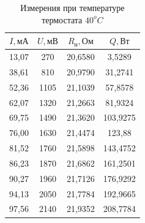     \begin{table}[!ht]
        \begin{minipage}{.42\linewidth}
            \centering
            \begin{tabular}{|c|c|c|c|}
                \hline

                $I, \text{мА}$ & $U, \text{мВ}$ &  $R_\text{н}, \text{Ом}$ & $Q, \text{Вт}$\\ \hline
                13,07	& 270	& 20,6580	& 3,5289 \\ \hline
                38,61	& 810	& 20,9790	& 31,2741 \\ \hline
                52,36	& 1105	& 21,1039	& 57,8578 \\ \hline
                62,07	& 1320	& 21,2663	& 81,9324 \\ \hline
                69,75	& 1490	& 21,3620	& 103,9275 \\ \hline
                76,00   & 1630	& 21,4474	& 123,88 \\ \hline
                81,52	& 1760	& 21,5898	& 143,4752 \\ \hline
                86,23	& 1870	& 21,6862	& 161,2501 \\ \hline
                90,27	& 1960	& 21,7126	& 176,9292 \\ \hline
                94,13	& 2050	& 21,7784	& 192,9665 \\ \hline
                97,56	& 2140	& 21,9352	& 208,7784 \\ \hline

            \end{tabular}
                \caption{Измерения при температуре термостата $40^oC$}
            \label{table_80}
        \end{minipage}
    \end{table}

